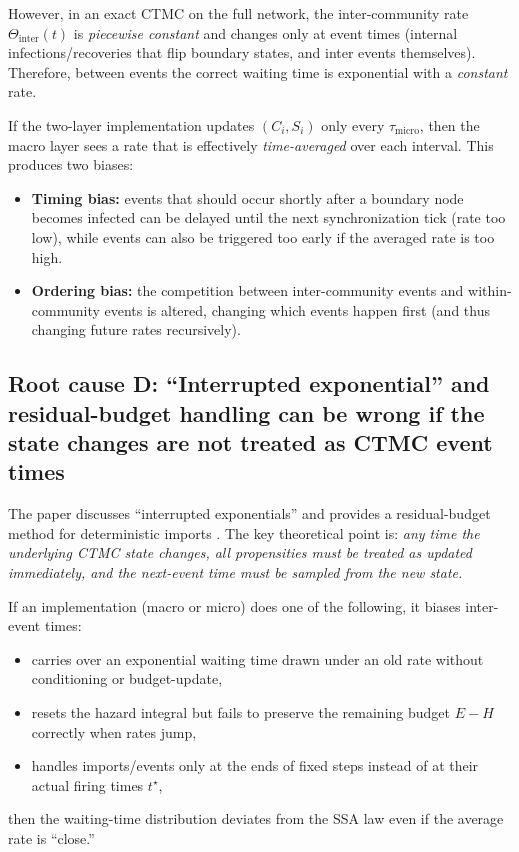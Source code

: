 \documentclass[11pt,a4paper]{article}
\begin{document}
However, in an exact CTMC on the full network, the inter-community rate $\Theta_{\text{inter}}(t)$ is \emph{piecewise
constant} and changes only at event times (internal infections/recoveries that flip boundary states, and inter events
themselves). Therefore, between events the correct waiting time is exponential with a \emph{constant} rate.

If the two-layer implementation updates $(C_i,S_i)$ only every $\tau_{\text{micro}}$, then the macro layer sees a
rate that is effectively \emph{time-averaged} over each interval. This produces two biases:
\begin{itemize}[leftmargin=*]
\item \textbf{Timing bias:} events that should occur shortly after a boundary node becomes infected can be delayed
until the next synchronization tick (rate too low), while events can also be triggered too early if the averaged
rate is too high.
\item \textbf{Ordering bias:} the competition between inter-community events and within-community events is altered,
changing which events happen first (and thus changing future rates recursively).
\end{itemize}

\subsection{Root cause D: ``Interrupted exponential'' and residual-budget handling can be wrong if the state changes are not treated as CTMC event times}

The paper discusses ``interrupted exponentials'' and provides a residual-budget method for deterministic imports
\cite{paper}. The key theoretical point is: \emph{any time the underlying CTMC state changes, all propensities must be
treated as updated immediately, and the next-event time must be sampled from the new state.}

If an implementation (macro or micro) does one of the following, it biases inter-event times:
\begin{itemize}[leftmargin=*]
\item carries over an exponential waiting time drawn under an old rate without conditioning or budget-update,
\item resets the hazard integral but fails to preserve the remaining budget $E-H$ correctly when rates jump,
\item handles imports/events only at the ends of fixed steps instead of at their actual firing times $t^\star$,
\end{itemize}
then the waiting-time distribution deviates from the SSA law even if the average rate is ``close.''
\end{document}
